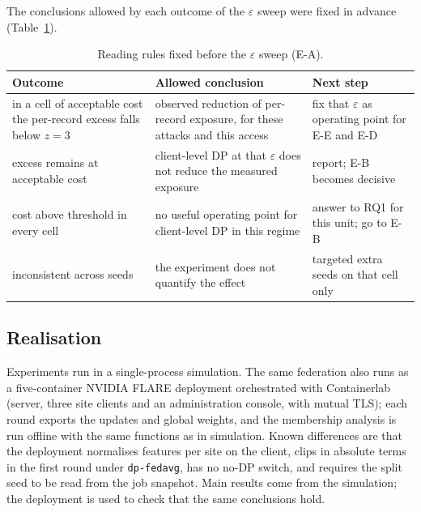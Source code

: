 The conclusions allowed by each outcome of the $\varepsilon$ sweep were fixed
in advance (Table~\ref{tab:reading}).

\begin{table}[t]
\centering
\caption{Reading rules fixed before the $\varepsilon$ sweep (E-A).}
\label{tab:reading}
\footnotesize
\begin{tabular}{@{}p{2.7cm}p{2.7cm}p{2.3cm}@{}}
\toprule
Outcome & Allowed conclusion & Next step \\
\midrule
in a cell of acceptable cost the per-record excess falls below $z = 3$ & observed reduction of per-record exposure, for these attacks and this access & fix that $\varepsilon$ as operating point for E-E and E-D \\
excess remains at acceptable cost & client-level DP at that $\varepsilon$ does not reduce the measured exposure & report; E-B becomes decisive \\
cost above threshold in every cell & no useful operating point for client-level DP in this regime & answer to RQ1 for this unit; go to E-B \\
inconsistent across seeds & the experiment does not quantify the effect & targeted extra seeds on that cell only \\
\bottomrule
\end{tabular}
\end{table}

\subsection{Realisation}
\label{sec:method-realisation}

Experiments run in a single-process simulation. The same federation also runs
as a five-container NVIDIA FLARE deployment orchestrated with Containerlab
(server, three site clients and an administration console, with mutual TLS);
each round exports the updates and global weights, and the membership analysis
is run offline with the same functions as in simulation. Known differences are
that the deployment normalises features per site on the client, clips in
absolute terms in the first round under \texttt{dp-fedavg}, has no no-DP
switch, and requires the split seed to be read from the job snapshot. Main
results come from the simulation; the deployment is used to check that the
same conclusions hold.
